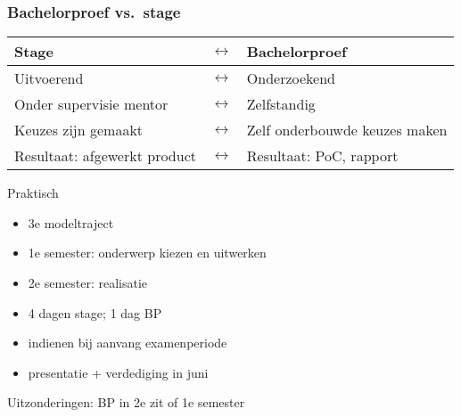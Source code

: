 \documentclass[aspectratio=169]{beamer}
\begin{document}
\begin{frame}
  \frametitle{Bachelorproef vs.\ stage}

  \centering
  \begin{tabular}{lcl}
    \toprule
    \textbf{Stage}               & $\leftrightarrow$ & \textbf{Bachelorproef}        \\
    \midrule
    Uitvoerend                   & $\leftrightarrow$ & Onderzoekend                  \\
    Onder supervisie mentor      & $\leftrightarrow$ & Zelfstandig                   \\
    Keuzes zijn gemaakt          & $\leftrightarrow$ & Zelf onderbouwde keuzes maken \\
    Resultaat: afgewerkt product & $\leftrightarrow$ & Resultaat: PoC, rapport       \\
    \bottomrule
  \end{tabular}
\end{frame}

\begin{frame}{Praktisch}

  \begin{itemize}
    \item 3e modeltraject
    \item 1e semester: onderwerp kiezen en uitwerken
    \item 2e semester: realisatie
    \item 4 dagen stage; 1 dag BP
    \item indienen bij aanvang examenperiode
    \item presentatie + verdediging in juni
  \end{itemize}

  \bigskip

  Uitzonderingen: BP in 2e zit of 1e semester
\end{frame}
\end{document}
